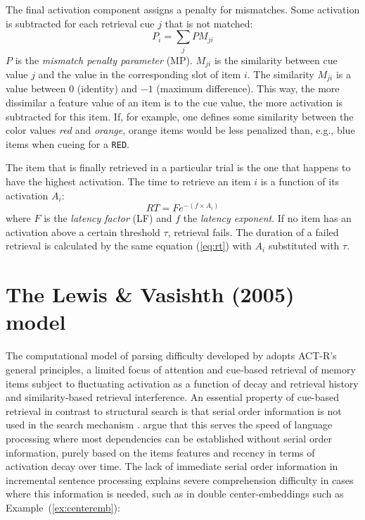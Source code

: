 \documentclass{cambridge7A}\usepackage[]{graphicx}\usepackage[]{color}
\newcommand{\actrcue}[1]{\texttt{\uppercase{#1}}}
\begin{document}
The final activation component assigns a penalty for mismatches. Some activation is subtracted for each retrieval cue $j$ that is not matched:
\begin{equation}\label{eq:pm}
	P_i = \sum_j PM_{ji}
\end{equation}
$P$ is the  \textit{mismatch penalty parameter} (MP). $M_{ji}$ is the similarity between cue value $j$ and the value in the corresponding slot of item $i$. The similarity $M_{ji}$ is a value between $0$ (identity) and $-1$ (maximum difference).
This way, the more dissimilar a feature value of an item is to the cue value, the more activation is subtracted for this item.
If, for example, one defines some similarity between the color values \textit{red} and \textit{orange}, orange items would be less penalized than, e.g., blue items when cueing for a \actrcue{red}.

The item that is finally retrieved in a particular trial is the one that happens to have the highest activation. The time to retrieve an item $i$ is a function of its activation $A_i$:
\begin{equation}\label{eq:rt}
	RT = Fe^{-(f\times A_i)}
\end{equation}
where $F$ is the  \textit{latency factor} (LF) and $f$ the \textit{latency exponent}. 
If no item has an activation above a certain threshold $\tau$, retrieval fails. The duration of a failed retrieval is calculated by the same equation (\ref{eq:rt}) with $A_i$ substituted with $\tau$.


\section{The Lewis \& Vasishth (2005) model}
The  computational model of parsing difficulty developed by \cite{LewisVasishth2005} adopts ACT-R's general principles, a limited focus of attention and cue-based retrieval of memory items subject to fluctuating activation as a function of decay and retrieval history and similarity-based retrieval interference. An essential property of  cue-based retrieval in contrast to structural search is that serial order information is not used in the search mechanism \citep{McElree2006,Ratcliff1978}. \cite{LewisVasishth2005} argue that this serves the speed of  language processing where most dependencies can be established without serial order information, purely based on the items features and recency in terms of activation decay over time. The lack of immediate serial order information in incremental sentence processing  explains severe comprehension difficulty in cases where this information is needed, such as in double center-embeddings such as Example~(\ref{ex:centeremb}):
\end{document}
